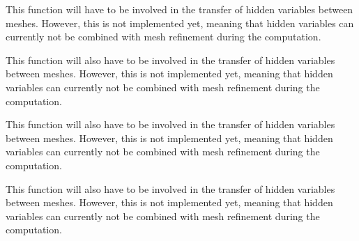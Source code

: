 \begin{DoxyRefList}
\item[Member \mbox{\hyperlink{classparallel_1_1_triangulation_system_a79e9789e83e12900c85cf8de0644271f}{parallel::Triangulation\+System$<$ spacedim $>$::pre\+\_\+refinement\+\_\+domain}} ()]\label{todo__todo000013}%
%
This function will have to be involved in the transfer of hidden variables between meshes. However, this is not implemented yet, meaning that hidden variables can currently not be combined with mesh refinement during the computation.  
\item[Member \mbox{\hyperlink{class_triangulation_system_a62be2563cc8d810a71941e15490f9840}{Triangulation\+System$<$ spacedim $>$::execute\+\_\+coarsening\+\_\+and\+\_\+refinement}} ()]\label{todo__todo000012}%
%
This function will also have to be involved in the transfer of hidden variables between meshes. However, this is not implemented yet, meaning that hidden variables can currently not be combined with mesh refinement during the computation.  
\item[Member \mbox{\hyperlink{class_triangulation_system_a8435489384095f687363d200ccfce628}{Triangulation\+System$<$ spacedim $>$::post\+\_\+refinement\+\_\+domain}} ()]\label{todo__todo000011}%
%
This function will also have to be involved in the transfer of hidden variables between meshes. However, this is not implemented yet, meaning that hidden variables can currently not be combined with mesh refinement during the computation.  
\item[Member \mbox{\hyperlink{class_triangulation_system_ae1862e6da3157dc8d539fdc0439e9f48}{Triangulation\+System$<$ spacedim $>$::pre\+\_\+refinement\+\_\+domain}} ()]\label{todo__todo000010}%
%
This function will also have to be involved in the transfer of hidden variables between meshes. However, this is not implemented yet, meaning that hidden variables can currently not be combined with mesh refinement during the computation. 
\end{DoxyRefList}